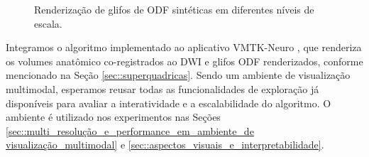 \begin{figure}[ht]
     \caption{Renderização de glifos de ODF sintéticas em diferentes níveis de escala.}
    \label{fig::ambiente_validacao}
\end{figure}



Integramos o algoritmo implementado ao aplicativo VMTK-Neuro \cite{VMTKNeuro}, que renderiza os volumes anatômico co-registrados ao DWI e glifos ODF renderizados, conforme mencionado na Seção \ref{sec::superquadricas}. Sendo um ambiente de visualização multimodal, esperamos reusar todas as funcionalidades de exploração já disponíveis para avaliar a interatividade e a escalabilidade do algoritmo. O ambiente é utilizado nos experimentos nas Seções \ref{sec::multi_resolução_e_performance_em_ambiente_de visualização_multimodal} e \ref{sec::aspectos_visuais_e_interpretabilidade}.







